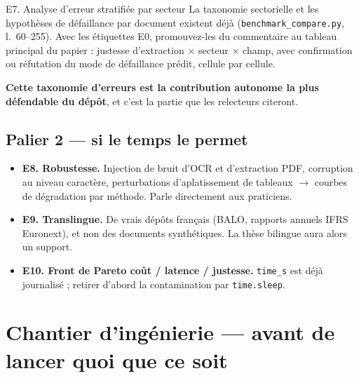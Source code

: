 \documentclass[11pt,a4paper]{article}
\newcommand{\fic}[1]{\texttt{\small #1}}
\begin{document}
\begin{exper}{E7. Analyse d'erreur stratifiée par secteur}
La taxonomie sectorielle et les hypothèses de défaillance par document existent
déjà (\fic{benchmark\_compare.py}, l.~60--255). Avec les étiquettes E0,
promouvez-les du commentaire au tableau principal du papier : justesse
d'extraction $\times$ secteur $\times$ champ, avec confirmation ou réfutation du
mode de défaillance prédit, cellule par cellule.

\textbf{Cette taxonomie d'erreurs est la contribution autonome la plus
défendable du dépôt}, et c'est la partie que les relecteurs citeront.
\end{exper}

\subsection{Palier 2 --- si le temps le permet}

\begin{itemize}[leftmargin=*, itemsep=4pt]
\item \textbf{E8. Robustesse.} Injection de bruit d'OCR et d'extraction PDF,
corruption au niveau caractère, perturbations d'aplatissement de tableaux
$\rightarrow$ courbes de dégradation par méthode. Parle directement aux
praticiens.
\item \textbf{E9. Translingue.} De vrais dépôts français (BALO, rapports annuels
IFRS Euronext), et non des documents synthétiques. La thèse bilingue aura alors
un support.
\item \textbf{E10. Front de Pareto coût / latence / justesse.} \fic{time\_s} est
déjà journalisé ; retirer d'abord la contamination par \fic{time.sleep}.
\end{itemize}

\section{Chantier d'ingénierie --- avant de lancer quoi que ce soit}
\label{sec:ingenierie}
\end{document}
